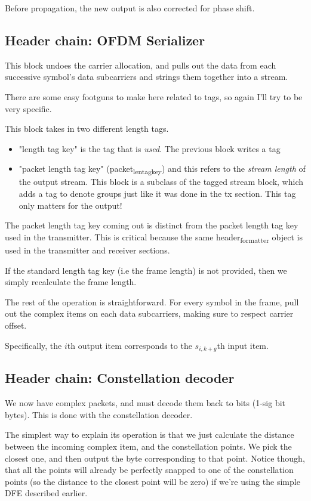 \documentclass[11pt]{article}
\begin{document}
Before propagation, the new output is also corrected for phase shift.
\subsection{Header chain: OFDM Serializer}
\label{sec:orgd9b6bad}
This block undoes the carrier allocation, and pulls out the data from
each successive symbol's data subcarriers and strings them together
into a stream.

There are some easy footguns to make here related to tags, so again
I'll try to be very specific.

This block takes in two different length tags.
\begin{itemize}
\item "length tag key" is the tag that is \emph{used}. The previous block
writes a tag
\item "packet length tag key" (packet\textsubscript{len}\textsubscript{tag}\textsubscript{key}) and this refers to the
\emph{stream length} of the output stream. This block is a subclass of
the tagged stream block, which adds a tag to denote groups just like
it was done in the tx section. This tag only matters for the output!
\end{itemize}

The packet length tag key coming out is distinct from the packet
length tag key used in the transmitter. This is critical because the
same header\textsubscript{formatter} object is used in the transmitter and receiver
sections.

If the standard length tag key (i.e the frame length) is not provided,
then we simply recalculate the frame length.

The rest of the operation is straightforward. For every symbol in the
frame, pull out the complex items on each data subcarriers, making
sure to respect carrier offset.

Specifically, the \(i\)th output item corresponds to the \(s_{i, k +
g}\)th input item.
\subsection{Header chain: Constellation decoder}
\label{sec:org10241bb}
We now have complex packets, and must decode them back to bits (1-sig
bit bytes). This is done with the constellation decoder.

The simplest way to explain its operation is that we just calculate
the distance between the incoming complex item, and the constellation
points. We pick the closest one, and then output the byte
corresponding to that point. Notice though, that all the points will
already be perfectly snapped to one of the constellation points (so
the distance to the closest point will be zero) if we're using the
simple DFE described earlier.
\end{document}
